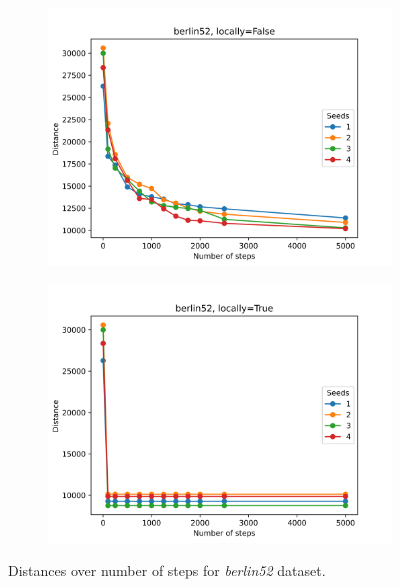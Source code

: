 	\begin{figure}[!htb]
		\centering
		\begin{subfigure}{0.45\textwidth}
			\includegraphics[width=\textwidth]{plots/berlin52_seeds_locally=False}
		\end{subfigure}
		\begin{subfigure}{0.45\textwidth}
			\includegraphics[width=\textwidth]{plots/berlin52_seeds_locally=True}
		\end{subfigure}
		\caption{Distances over number of steps for \textit{berlin52} dataset.}
		\label{fig:berlin52_seeds}
	\end{figure}
	

